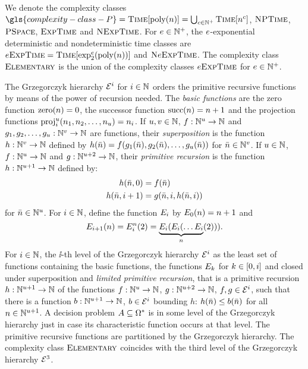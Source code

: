 We denote the complexity classes $\gls{complexity-class-P} =
\cTime{\poly\nn} = \bigcup_{c \in \pNats} \cTime{\nn^c}$,
$\text{\normalfont{\scshape NPTime}}$, $\text{\normalfont{\scshape PSpace}}$, $\text{\normalfont{\scshape ExpTime}}$ and $\text{\normalfont{\scshape NExpTime}}$.
For $e \in \mathbb{N}^{+}$, the
$e$-exponential deterministic and nondeterministic time classes are
${e\text{\normalfont{\scshape ExpTime}}} = \text{\normalfont{\scshape Time}}[\exp_{2}^{e}(\operatorname{poly}(n))]$ and $\text{\normalfont{\scshape N}}e\text{\normalfont{\scshape ExpTime}}$.
The complexity class $\text{\normalfont{\scshape Elementary}}$ is the union of the complexity classes
${e\text{\normalfont{\scshape ExpTime}}}$ for $e \in \mathbb{N}^{+}$.

The Grzegorczyk hierarchy $\mathcal{E}^{i}$ for $i\in\mathbb{N}$ orders the primitive
recursive functions by means of the power of recursion needed.
The \emph{basic functions} are
the zero function $\mathrm{zero}(n) = 0$,
the successor function $\mathrm{succ}(n) = n+1$ and
the projection functions $\mathrm{proj}_i^u(n_1,n_2,\dots,n_u) = n_i$.
If $u,v \in \mathbb{N}$, $f : \mathbb{N}^u \to \mathbb{N}$ and
$g_1,g_2,\dots,g_u : \mathbb{N}^v \to \mathbb{N}$ are functions,
their \emph{superposition} is the function $h : \mathbb{N}^v \to \mathbb{N}$
defined by $h(\bar{n}) =
  f(
  g_1(\bar{n}),
  g_2(\bar{n}), \dots,
  g_u(\bar{n}))$ for $\bar{n} \in \mathbb{N}^v$.
If $u \in \mathbb{N}$, $f : \mathbb{N}^u \to \mathbb{N}$ and
$g : \mathbb{N}^{u+2} \to \mathbb{N}$, their \emph{primitive recursion} is the
function $h : \mathbb{N}^{u+1} \to \mathbb{N}$ defined by:
\begin{align*}
h(\bar{n},0) &= f(\bar{n}) \\
h(\bar{n},i+1) &= g(\bar{n},i,h(\bar{n},i))
\end{align*}
for $\bar{n} \in \mathbb{N}^u$.
For $i \in \mathbb{N}$, define the function $E_{i}$ by $E_{0}(n) =
n+1$ and 
\[
  E_{i+1}(n) = E_{i}^n(2) =
  \underbrace{E_{i}(E_{i}(\dots E_{i}}_n(2))).
\]
For $i \in \mathbb{N}$, the $\ii$-th level of the Grzegorczyk hierarchy $\mathcal{E}^{i}$
as the least set of functions containing the basic functions, the functions
$E_{k}$ for $k \in [0,i]$ and closed under superposition and
\emph{limited primitive recursion}, that is a primitive recursion $h :
\mathbb{N}^{u+1}\to\mathbb{N}$ of the functions $f : \mathbb{N}^u \to \mathbb{N}$, 
$g : \mathbb{N}^{u+2} \to \mathbb{N}$, $f,g \in \mathcal{E}^{i}$, such that there is a function
$b : \mathbb{N}^{u+1} \to \mathbb{N}$,
$b \in \mathcal{E}^{i}$ bounding $h$: $h(\bar{n}) \leq b(\bar{n})$ for all $n \in
\mathbb{N}^{u+1}$. A decision problem $A \subseteq \Omega^{*}$ is in some
level of the Grzegorczyk hierarchy just in case its characteristic function
occurs at that level.
The primitive recursive functions are partitioned by the Grzegorczyk hierarchy.
The complexity class $\text{\normalfont{\scshape Elementary}}$ coincides with the third level of the
Grzegorczyk hierarchy $\mathcal{E}^{3}$.
